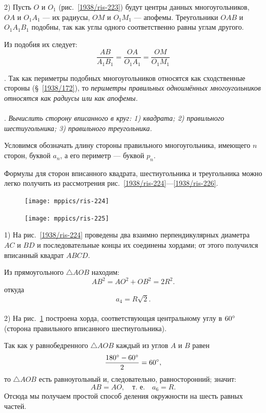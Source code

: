 \documentclass[oneside]{book}
\begin{document}
2) Пусть $O$ и $O_1$ (рис.~\ref{1938/ris-223}) будут центры данных многоугольников, $OA$ и $O_1A_1$ — их радиусы, $OM$ и $O_1M_1$ — апофемы.
Треугольники $OAB$ и $O_1A_1B_1$ подобны, так как углы одного соответственно равны углам другого.

Из подобия их следует:
\[\frac{AB}{A_1B_1}=\frac{OA}{O_1A_1} = \frac{OM}{O_1M_1}\]

.
Так как периметры подобных многоугольников относятся как сходственные стороны (§~\ref{1938/172}), то \emph{периметры правильных одноимённых многоугольников относятся как радиусы или как апофемы.}


\paragraph{}\label{1938/219}
.
\emph{Вычислить сторону вписанного в круг:
1) квадрата;
2) правильного шестиугольника;
3) правильного треугольника.}

Условимся обозначать длину стороны правильного многоугольника, имеющего $n$ сторон, буквой $a_n$, а его периметр — буквой $p_n$.


Формулы для сторон вписанного квадрата, шестиугольника и треугольника можно легко получить из рассмотрения рис.~\ref{1938/ris-224}---\ref{1938/ris-226}.

\begin{figure}
\vskip-4mm
\centering
\texttt{[image: mppics/ris-224]}
\caption{}\label{1938/ris-224}
\bigskip
\texttt{[image: mppics/ris-225]}
\caption{}\label{1938/ris-225}
\end{figure}

1) На рис.~\ref{1938/ris-224} проведены два взаимно перпендикулярных диаметра $AC$ и $BD$ и последовательные концы их соединены хордами;
от этого получился вписанный квадрат $ABCD$.

Из прямоугольного $\triangle AOB$ находим:
\[AB^2=AO^2+OB^2=2R^2.\]
откуда
\[a_4=R\sqrt2.\]

\paragraph{}\label{1938/220}
2) На рис.~\ref{1938/ris-225} построена хорда, соответствующая центральному углу в $60\degree$ (сторона правильного вписанного шестиугольника).

Так как у равнобедренного $\triangle AOB$ каждый из углов $A$ и $B$ равен \[\frac{180\degree-60\degree} 2 = 60\degree,\] то $\triangle AOB$ есть равноугольный и, следовательно, равносторонний;
значит:
\[AB=AO,\quad\text{т.~е.}\quad a_6 = R.\]
Отсюда мы получаем простой способ деления окружности на шесть равных частей.
\end{document}
